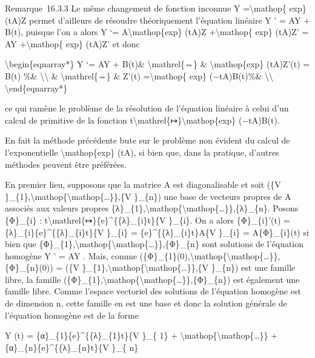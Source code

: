 \documentclass[]{article}
\begin{document}
Remarque~16.3.3 Le même changement de fonction inconnue Y
=\textbackslash{}mathop\{ exp\} (tA)Z permet d'ailleurs de résoudre
théoriquement l'équation linéaire Y ' = AY + B(t), puisque l'on a alors
Y `= A\textbackslash{}mathop\{exp\} (tA)Z +\textbackslash{}mathop\{
exp\} (tA)Z' = AY +\textbackslash{}mathop\{ exp\} (tA)Z' et donc

\textbackslash{}begin\{eqnarray*\} Y `= AY + B(t)\&
\textbackslash{}mathrel\{⇔\} \& \textbackslash{}mathop\{exp\} (tA)Z'(t)
= B(t) \%\& \textbackslash{}\textbackslash{} \&
\textbackslash{}mathrel\{⇔\} \& Z'(t) =\textbackslash{}mathop\{ exp\}
(−tA)B(t)\%\& \textbackslash{}\textbackslash{}
\textbackslash{}end\{eqnarray*\}

ce qui ramène le problème de la résolution de l'équation linéaire à
celui d'un calcul de primitive de la fonction
t\textbackslash{}mathrel\{↦\}\textbackslash{}mathop\{exp\} (−tA)B(t).

En fait la méthode précédente bute sur le problème non évident du calcul
de l'exponentielle \textbackslash{}mathop\{exp\} (tA), si bien que, dans
la pratique, d'autres méthodes peuvent être préférées.

En premier lieu, supposons que la matrice A est diagonalisable et soit
(\{V
\}\_\{1\},\textbackslash{}mathop\{\textbackslash{}mathop\{\ldots{}\}\},\{V
\}\_\{n\}) une base de vecteurs propres de A associés aux valeurs
propres
\{λ\}\_\{1\},\textbackslash{}mathop\{\textbackslash{}mathop\{\ldots{}\}\},\{λ\}\_\{n\}.
Posons \{Φ\}\_\{i\} :
t\textbackslash{}mathrel\{↦\}\{e\}\^{}\{\{λ\}\_\{i\}t\}\{V \}\_\{i\}. On
a alors \{Φ\}\_\{i\}'(t) = \{λ\}\_\{i\}\{e\}\^{}\{\{λ\}\_\{i\}t\}\{V
\}\_\{i\} = \{e\}\^{}\{\{λ\}\_\{i\}t\}A\{V \}\_\{i\} = A\{Φ\}\_\{i\}(t)
si bien que
\{Φ\}\_\{1\},\textbackslash{}mathop\{\textbackslash{}mathop\{\ldots{}\}\},\{Φ\}\_\{n\}
sont solutions de l'équation homogène Y ' = AY . Mais, comme
(\{Φ\}\_\{1\}(0),\textbackslash{}mathop\{\textbackslash{}mathop\{\ldots{}\}\},\{Φ\}\_\{n\}(0))
= (\{V
\}\_\{1\},\textbackslash{}mathop\{\textbackslash{}mathop\{\ldots{}\}\},\{V
\}\_\{n\}) est une famille libre, la famille
(\{Φ\}\_\{1\},\textbackslash{}mathop\{\textbackslash{}mathop\{\ldots{}\}\},\{Φ\}\_\{n\})
est également une famille libre. Comme l'espace vectoriel des solutions
de l'équation homogène est de dimension n, cette famille en est une base
et donc la solution générale de l'équation homogène est de la forme

Y (t) = \{α\}\_\{1\}\{e\}\^{}\{\{λ\}\_\{1\}t\}\{V \}\_\{ 1\} +
\textbackslash{}mathop\{\textbackslash{}mathop\{\ldots{}\}\} +
\{α\}\_\{n\}\{e\}\^{}\{\{λ\}\_\{n\}t\}\{V \}\_\{ n\}
\end{document}
